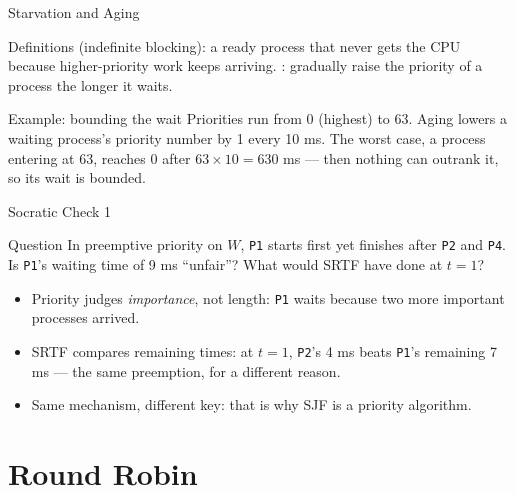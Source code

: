 \documentclass[aspectratio=169]{beamer}
\begin{document}
\begin{frame}{Starvation and Aging}
  \begin{block}{Definitions}
     (indefinite blocking): a ready process that never gets
    the CPU because higher-priority work keeps arriving.
    : gradually raise the priority of a process the longer it
    waits.
  \end{block}
  \begin{exampleblock}{Example: bounding the wait}
    Priorities run from 0 (highest) to 63. Aging lowers a waiting process's
    priority number by 1 every 10 ms. The worst case, a process entering at
    63, reaches 0 after $63 \times 10 = 630$ ms --- then nothing can
    outrank it, so its wait is bounded.
  \end{exampleblock}
\end{frame}

\begin{frame}{Socratic Check 1}
  \begin{block}{Question}
    In preemptive priority on $W$, \texttt{P1} starts first yet finishes
    after \texttt{P2} and \texttt{P4}. Is \texttt{P1}'s waiting time of 9 ms
    ``unfair''? What would SRTF have done at $t=1$?
  \end{block}
  \vspace{0.25cm}
  \begin{itemize}
    \item Priority judges \emph{importance}, not length: \texttt{P1} waits
      because two more important processes arrived.
    \item SRTF compares remaining times: at $t=1$, \texttt{P2}'s 4 ms beats
      \texttt{P1}'s remaining 7 ms --- the same preemption, for a different
      reason.
    \item Same mechanism, different key: that is why SJF is a priority
      algorithm.
  \end{itemize}
\end{frame}


\section{Round Robin}
\end{document}
